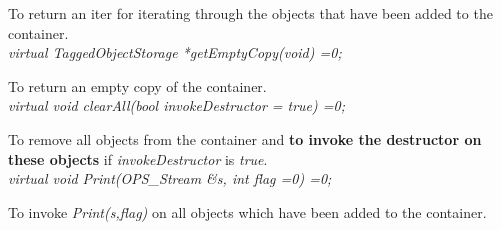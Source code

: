 To return an iter for iterating through the objects that have been
added to the container. \\

{\em virtual TaggedObjectStorage *getEmptyCopy(void) =0;}

To return an empty copy of the container. \\

{\em virtual void clearAll(bool invokeDestructor = true) =0;}

To remove all objects from the container and {\bf to invoke the
destructor on these objects} if {\em invokeDestructor} is {\em true}. \\

{\em virtual void Print(OPS_Stream \&s, int flag =0) =0;}

To invoke {\em Print(s,flag)} on all objects which have been added to
the container. 





